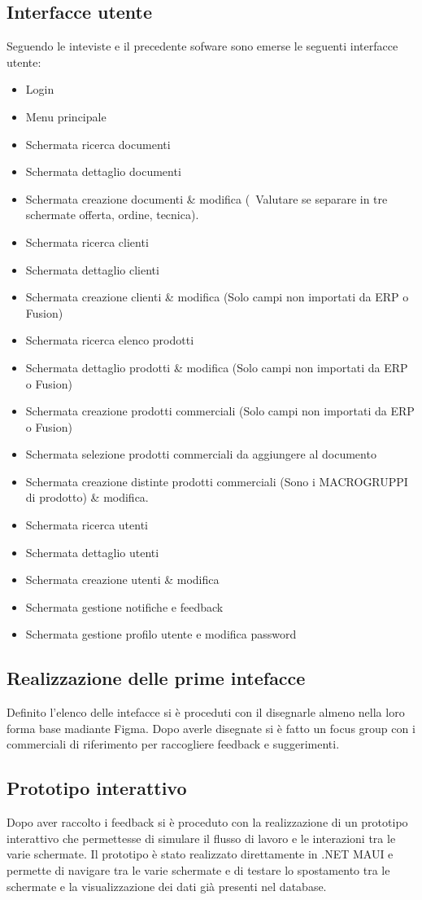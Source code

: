 \documentclass[12pt, a4paper]{article}
\begin{document}
\subsection{Interfacce utente}
Seguendo le inteviste e il precedente sofware sono emerse le seguenti interfacce utente:
\begin{itemize}
      \item Login
      \item Menu principale
      \item Schermata ricerca documenti
      \item Schermata dettaglio documenti
      \item Schermata creazione documenti \& modifica (\ Valutare se separare in tre schermate offerta, ordine, tecnica).
      \item Schermata ricerca clienti
      \item Schermata dettaglio clienti
      \item Schermata creazione clienti \& modifica (Solo campi non importati da ERP o Fusion)
      \item Schermata ricerca elenco prodotti
      \item Schermata dettaglio prodotti \& modifica (Solo campi non importati da ERP o Fusion)
      \item Schermata creazione prodotti commerciali (Solo campi non importati da ERP o Fusion)
      \item Schermata selezione prodotti commerciali da aggiungere al documento
      \item Schermata creazione distinte prodotti commerciali (Sono i MACROGRUPPI di prodotto) \& modifica.
      \item Schermata ricerca utenti
      \item Schermata dettaglio utenti
      \item Schermata creazione utenti \& modifica
      \item Schermata gestione notifiche e feedback
      \item Schermata gestione profilo utente e modifica password
  \end{itemize}
  \subsection{Realizzazione delle prime intefacce}
  Definito l'elenco delle intefacce si è proceduti con il disegnarle almeno nella loro forma base
  madiante Figma.
  Dopo averle disegnate si è fatto un focus group con i commerciali di riferimento
  per raccogliere feedback e suggerimenti.
  \subsection{Prototipo interattivo}
      Dopo aver raccolto i feedback si è proceduto con la realizzazione di un prototipo interattivo
      che permettesse di simulare il flusso di lavoro e le interazioni tra le varie schermate.
      Il prototipo è stato realizzato direttamente in .NET MAUI e permette di navigare tra le varie schermate
      e di testare lo spostamento tra le schermate e la visualizzazione dei dati già presenti nel database.
\end{document}
